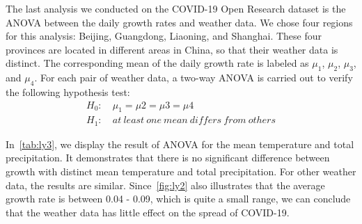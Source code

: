 The last analysis we conducted on the COVID-19 Open Research dataset is the ANOVA between the daily growth rates and weather data. We chose four regions for this analysis: Beijing, Guangdong, Liaoning, and Shanghai. These four provinces are located in different areas in China, so that their weather data is distinct. The corresponding mean of the daily growth rate is labeled as $\mu_1$, $\mu_2$, $\mu_3$, and $\mu_4$. For each pair of weather data, a two-way ANOVA is carried out to verify the following hypothesis test:
    \begin{align}
        H_0: & \:\mu_1 = \mu2 = \mu3 = \mu4 \\
        H_1: & \:\mathit{at\:least\:one\:mean\:differs\:from\:others}
    \end{align}

In~\cref{tab:ly3}, we display the result of ANOVA for the mean temperature and total precipitation. It demonstrates that there is no significant difference between growth with distinct mean temperature and total precipitation. For other weather data, the results are similar. Since~\cref{fig:ly2} also illustrates that the average growth rate is between 0.04 - 0.09, which is quite a small range, we can conclude that the weather data has little effect on the spread of COVID-19.

\begin{table}[]
\centering
\caption{ANOVA Result for Mean Temperature and Total Precipitation}
\label{tab:ly3}
\end{table}
